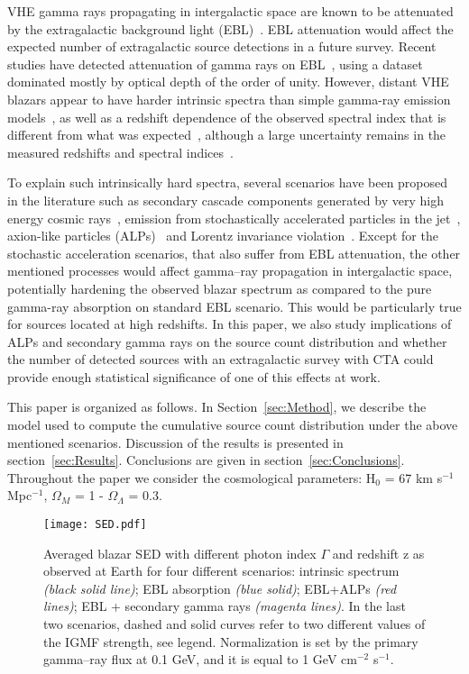 \documentclass[final,5p]{elsarticle}
\begin{document}
VHE gamma rays propagating in intergalactic space are known to be attenuated by the extragalactic background light (EBL)~\cite{EBL_1,EBL_2,EBL_3,EBL_4}. EBL attenuation would affect the expected number of extragalactic source detections in a future survey. Recent studies have detected attenuation of gamma rays on EBL~\cite{EBL_VHE_1,EBL_VHE_2,EBL_VHE_3}, using a dataset dominated mostly by optical depth of the order of unity. However, distant VHE blazars appear to have harder intrinsic spectra than simple gamma-ray emission models~\cite{Horns2012}, as well as a redshift dependence of the observed spectral index that is different from what was expected~\cite{Blazar_z_1,Blazar_z_2,Rubtsov2014,Sanchez2013A&A}, although a large uncertainty remains in the measured redshifts and spectral indices~\cite{ Costamante2013,Dominguez_Ajello2015}. 

To explain such intrinsically hard spectra, several scenarios have been proposed in the literature such as secondary cascade components generated by very high energy cosmic rays~\cite{Acero2013,EsseyKusenko2010,Essey2010}, emission from stochastically accelerated particles in the jet~\cite{Lefa2011}, axion-like particles (ALPs)~\cite{Doro2013,Abramowski2013,deAngelis2011,deAngelis07,Mirizzi07,MiguelALP,Meyer2013PhRvD} and Lorentz invariance violation~\cite{Doro2013}. Except for the stochastic acceleration scenarios, that also suffer from EBL attenuation, the other mentioned processes would affect gamma--ray propagation in intergalactic space, potentially hardening the observed blazar spectrum as compared to the pure gamma-ray absorption on standard EBL scenario. This would be particularly true for sources located at high redshifts. In this paper, we also study implications of ALPs and secondary gamma rays on the source count distribution and whether the number of detected sources with an extragalactic survey with CTA could provide enough statistical significance of one of this effects at work.

This paper is organized as follows. In Section~\ref{sec:Method}, we describe the model used to compute the cumulative source count distribution under the above mentioned scenarios. Discussion of the results is presented in section~\ref{sec:Results}. Conclusions are given in section~\ref{sec:Conclusions}. Throughout the paper we consider the cosmological parameters: H$_0$ = 67 km s$^{-1}$ Mpc$^{-1}$, $\Omega_M$ = 1 - $\Omega_{\Lambda}$ = 0.3.

\begin{figure*}[!htb]
  \centering
\texttt{[image: SED.pdf]} 
\caption{Averaged blazar SED with different photon index $\Gamma$ and redshift z as observed at Earth for four different scenarios: intrinsic spectrum \textit{(black solid line)}; EBL absorption \textit{(blue solid)}; EBL+ALPs \textit{(red lines)}; EBL + secondary gamma rays \textit{(magenta lines)}. In the last two scenarios, dashed and solid curves refer to two different values of the IGMF strength, see legend. Normalization is set by the primary gamma--ray flux at 0.1 GeV, and it is equal to 1 GeV cm$^{-2}$ s$^{-1}$.}
\label{figSED}
\end{figure*}
\end{document}
